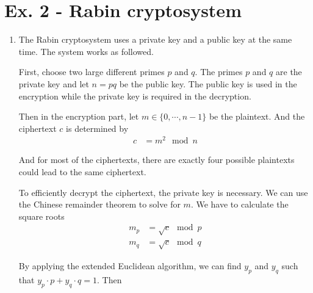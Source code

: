 \documentclass[11pt,a4paper]{article}
\begin{document}
\section*{Ex. 2 - Rabin cryptosystem}
\begin{enumerate}
	\item The Rabin cryptosystem uses a private key and a public key at the same time. The system works as followed.
	\par First, choose two large different primes $p$ and $q$. The primes $p$ and $q$ are the private key and let $n = pq$ be the public key. The public key is used in the encryption while the private key is required in the decryption.
	\par Then in the encryption part, let $m \in \{ 0, \cdots, n-1 \}$ be the plaintext. And the ciphertext $c$ is determined by
		\begin{align*}
			c &= m^{2} \mod n
		\end{align*}
	\par And for most of the ciphertexts, there are exactly four possible plaintexts could lead to the same ciphertext.
	\par To efficiently decrypt the ciphertext, the private key is necessary. We can use the Chinese remainder theorem to solve for $m$. We have to calculate the square roots
		\begin{align*}
			m_{p} &= \sqrt{c} \mod p \\
			m_{q} &= \sqrt{c} \mod q
		\end{align*}
	\par By applying the extended Euclidean algorithm, we can find $y_{p}$ and $y_{q}$ such that $y_{p}\cdot p + y_{q}\cdot q = 1$. Then 

\end{enumerate}
\end{document}
